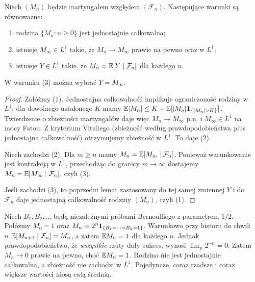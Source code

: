 \begin{twierdzenie}
Niech $(M_n)$ będzie martyngałem względem
$(\mathcal F_n)$. Następujące warunki są równoważne:
\begin{enumerate}
\item rodzina $\{M_n:n\geq0\}$ jest jednostajnie całkowalna;
\item istnieje $M_\infty\in L^1$ takie, że
$M_n\to M_\infty$ prawie na pewno oraz w $L^1$;
\item istnieje $Y\in L^1$ takie, że
$M_n=\mathbb{E}[Y\mid\mathcal F_n]$ dla każdego $n$.
\end{enumerate}
W warunku (3) można wybrać $Y=M_\infty$.
\end{twierdzenie}
\begin{proof}
Załóżmy (1). Jednostajna całkowalność implikuje
ograniczoność rodziny w $L^1$:
dla dowolnego ustalonego $K$ mamy
$\E|M_n|\leq K+\E[|M_n|\ind{\{|M_n|>K\}}]$.
Twierdzenie o zbieżności martyngałów daje więc
$M_n\to M_\infty$ p.n. i $M_\infty\in L^1$
na mocy Fatou. Z kryterium Vitaliego
(zbieżność według prawdopodobieństwa plus
jednostajna całkowalność) otrzymujemy zbieżność
w $L^1$. To daje (2).

Niech zachodzi (2). Dla $m\geq n$ mamy
$M_n=\mathbb{E}[M_m\mid\mathcal F_n]$.
Ponieważ warunkowanie jest kontrakcją w $L^1$,
przechodząc do granicy $m\to\infty$ dostajemy
$M_n=\mathbb{E}[M_\infty\mid\mathcal F_n]$,
czyli (3).

Jeśli zachodzi (3), to poprzedni lemat
zastosowany do tej samej zmiennej $Y$
i do $\mathcal F_n$ daje jednostajną całkowalność
rodziny $(M_n)$, czyli (1).
\end{proof}

\begin{przyklad}
Niech $B_1,B_2,\ldots$ będą niezależnymi
próbami Bernoulliego z parametrem $1/2$.
Połóżmy
$M_0=1$ oraz
$M_n=2^n\mathbf{1}_{\{B_1=\cdots=B_n=1\}}$.
Warunkowo przy historii do chwili $n$
$\mathbb{E}[M_{n+1}\mid\mathcal F_n]=M_n$,
a zatem $\mathbb{E} M_n=1$ dla każdego $n$.
Jednak prawdopodobieństwo, że \emph{wszystkie}
rzuty dały sukces, wynosi
$\lim_n2^{-n}=0$. Zatem $M_n\to0$ prawie na
pewno, choć $\mathbb{E} M_n=1$. Rodzina nie jest
jednostajnie całkowalna, a zbieżność nie
zachodzi w $L^1$. Pojedyncze, coraz rzadsze
i coraz większe wartości niosą całą średnią.
\end{przyklad}

